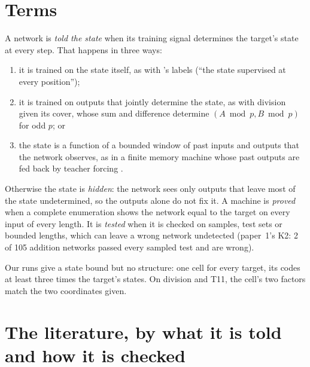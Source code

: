 \documentclass[11pt]{article}
\begin{document}
\section{Terms}

A network is \emph{told the state} when its training signal determines the target's state at every
step. That happens in three ways:
\begin{enumerate}
\item it is trained on the state itself, as with \citeauthor{brandoit-2026-length-independent-state-tracking}'s
  labels (``the state supervised at every position'');
\item it is trained on outputs that jointly determine the state, as with division given its
  cover, whose sum and difference determine $(A \bmod p, B \bmod p)$ for odd $p$; or
\item the state is a function of a bounded window of past inputs and outputs that the network
  observes, as in a finite memory machine whose past outputs are fed back by teacher forcing
  \citep{giles-1995-learning-class-large-finite-state-machines}.
\end{enumerate}
Otherwise the state is \emph{hidden}: the network sees only outputs that leave most of the state
undetermined, so the outputs alone do not fix it. A machine is \emph{proved} when a complete
enumeration shows the network equal to the target on every input of every length. It is
\emph{tested} when it is checked on samples, test sets or bounded lengths, which can leave a wrong
network undetected (paper~1's K2: 2 of 105 addition networks passed every sampled test and are wrong).

Our runs give a state bound but no structure: one cell for every target, its codes at least three
times the target's states. On division and T11, the cell's two factors match the two coordinates
given.

\section{The literature, by what it is told and how it is checked}
\end{document}
